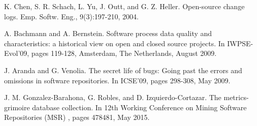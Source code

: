 \begin{thebibliography}{99.}
 K. Chen, S. R. Schach, L. Yu, J. Outt, and G. Z. Heller. Open-source change logs. Emp. 
Softw. Eng., 9(3):197-210, 2004.

 A. Bachmann and A. Bernstein. Software process data quality and characteristics: a 
historical view on open and closed source projects. In IWPSE-Evol'09, pages 119-128, Amsterdam, The 
Netherlands, August 2009.

 J. Aranda and G. Venolia. The secret life of bugs: Going past the errors and omissions 
in software repositories. In ICSE'09, pages 298-308, May 2009.

 J. M. Gonzalez-Barahona, G. Robles, and D. Izquierdo-Cortazar. The metrics-
grimoire database collection. In 12th Working Conference on Mining Software
Repositories (MSR) , pages 478481, May 2015.

\end{thebibliography}
